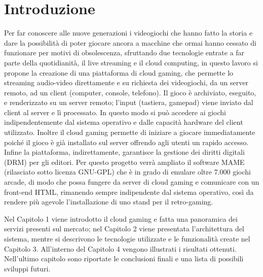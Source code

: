 %
%

\chapter*{Introduzione}
Per far conoscere alle nuove generazioni i videogiochi che hanno fatto la storia e dare la possibilità di poter giocare ancora a macchine che ormai hanno cessato di funzionare per motivi di obsolescenza, sfruttando due tecnologie entrate a far parte della quotidianità, il live streaming e il cloud computing, in questo lavoro si propone la creazione di una piattaforma di cloud gaming, che permette lo streaming audio-video direttamente e su richiesta dei videogiochi, da un server remoto, ad un client (computer, console, telefono). Il gioco è archiviato, eseguito, e renderizzato su un server remoto; l'input (tastiera, gamepad) viene inviato dal client al server e lì processato. In questo modo si può accedere ai giochi indipendentemente dal sistema operativo e dalle capacità hardware del client utilizzato. Inoltre il cloud gaming permette di iniziare a giocare immediatamente poiché il gioco è già installato sul server offrendo agli utenti un rapido accesso. Infine la piattaforma, indirettamente, garantisce la gestione dei diritti digitali (DRM) per gli editori. Per questo progetto verrà ampliato il software MAME (rilasciato sotto licenza GNU-GPL) che è in grado di emulare oltre 7.000 giochi arcade, di modo che possa fungere da server di cloud gaming e comunicare con un front-end HTML, rimanendo sempre indipendente dal sistema operativo, così da rendere più agevole l’installazione di uno stand per il retro-gaming.

Nel Capitolo 1 viene introdotto il cloud gaming e fatta una panoramica dei servizi presenti sul mercato; nel Capitolo 2 viene presentata l'architettura del sistema, mentre si descrivono le tecnologie utilizzate e le funzionalità create nel Capitolo 3. All’interno del Capitolo 4 vengono illustrati i risultati ottenuti. Nell'ultimo capitolo sono riportate le conclusioni finali e una lista di possibili sviluppi futuri.